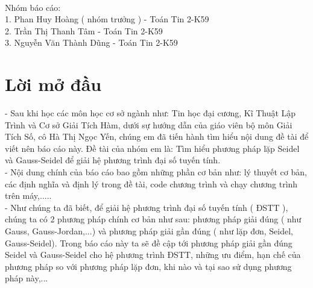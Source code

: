 \documentclass[12pt,a4paper]{article}
\begin{document}
\\
\begin{center}
Nhóm báo cáo: \\ 

1. Phan Huy Hoàng ( nhóm trưởng ) - Toán Tin 2-K59\\

2. Trần Thị Thanh Tâm - Toán Tin 2-K59\\

3. Nguyễn Văn Thành Dũng - Toán Tin 2-K59\\

\end{center} 

\newpage   %


\tableofcontents{}    %

\newpage

\section{Lời mở đầu }
\hspace{0.7cm}- Sau khi học các môn học cơ sở ngành như: Tin học đại cương, Kĩ Thuật Lập Trình và Cơ sở Giải Tích Hàm, dưới sự hướng dẫn của giáo viên bộ môn Giải Tích Số, cô Hà Thị Ngọc Yến, chúng em đã tiến hành tìm hiểu nội dung đề tài để viết nên báo cáo này. Đề tài của nhóm em là: {\color{red}Tìm hiểu phương pháp lặp Seidel và Gauss-Seidel để giải hệ phương trình đại số tuyến tính}. \\

- Nội dung chính của báo cáo bao gồm những phần cơ bản như: lý thuyết cơ bản, các định nghĩa và định lý trong đề tài, code chương trình và chạy chương trình trên máy,..... \\

- Như chúng ta đã biết, để giải hệ phương trình đại số tuyến tính ( ĐSTT ), chúng ta có 2 phương pháp chính cơ bản như sau: phương pháp giải đúng ( như Gauss, Gauss-Jordan,...) và phương pháp giải gần đúng ( như lặp đơn, Seidel, Gauss-Seidel). Trong báo cáo này ta sẽ đề cập tới phương pháp giải gần đúng Seidel và Gauss-Seidel cho hệ phương trình ĐSTT, những ưu điểm, hạn chế của phương pháp so với phương pháp lặp đơn, khi nào và tại sao sử dụng phương pháp này,...\\
\end{document}
